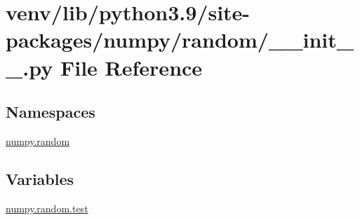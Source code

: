 \hypertarget{venv_2lib_2python3_89_2site-packages_2numpy_2random_2____init_____8py}{}\section{venv/lib/python3.9/site-\/packages/numpy/random/\+\_\+\+\_\+init\+\_\+\+\_\+.py File Reference}
\label{venv_2lib_2python3_89_2site-packages_2numpy_2random_2____init_____8py}
\subsection*{Namespaces}
\begin{DoxyCompactItemize}
\item 
 \hyperlink{namespacenumpy_1_1random}{numpy.\+random}
\end{DoxyCompactItemize}
\subsection*{Variables}
\begin{DoxyCompactItemize}
\item 
\hyperlink{namespacenumpy_1_1random_a41387850fe19531cd12964fe00630cce}{numpy.\+random.\+test}
\end{DoxyCompactItemize}
